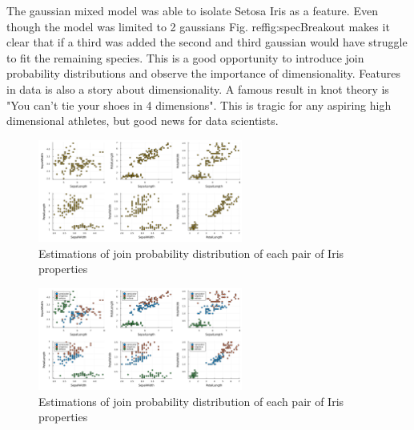 The gaussian mixed model was able to isolate Setosa Iris as a feature. Even though the model was limited to 2 gaussians Fig. ref{fig:specBreakout} makes it clear that if a third was added the second and third gaussian would have struggle to fit the remaining species. This is a good opportunity to introduce join probability distributions and observe the importance of dimensionality. Features in data is also a story about dimensionality. A famous result in knot theory is "You can't tie your shoes in 4 dimensions". This is tragic for any aspiring high dimensional athletes, but good news for data scientists. 
\begin{figure}
\centering
    \includegraphics[width=0.60\textwidth]{Code/3by2PropVsPropUnLabeled.png}
    \caption{Estimations of join probability distribution of each pair of Iris properties}
    \label{fig:3by2PropVsPropUnLabeled}
\end{figure}
\begin{figure}
\centering
    \includegraphics[width=0.60\textwidth]{Code/3by2PropVsPropLabeled.png}
    \caption{Estimations of join probability distribution of each pair of Iris properties}
    \label{fig:3by2PropVsPropLabeled}
\end{figure}
